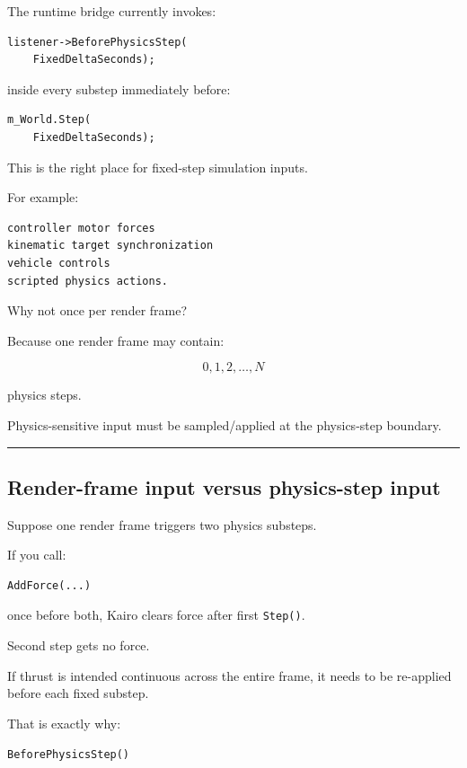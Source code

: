 The runtime bridge currently invokes:

\begin{verbatim}
listener->BeforePhysicsStep(
    FixedDeltaSeconds);
\end{verbatim}

inside every substep immediately before:

\begin{verbatim}
m_World.Step(
    FixedDeltaSeconds);
\end{verbatim}

This is the right place for fixed-step simulation inputs.

For example:

\begin{verbatim}
controller motor forces
kinematic target synchronization
vehicle controls
scripted physics actions.
\end{verbatim}

Why not once per render frame?

Because one render frame may contain:

\[
0,1,2,\dots,N
\]

physics steps.

Physics-sensitive input must be sampled/applied at the physics-step boundary.

\begin{center}\rule{0.5\linewidth}{0.5pt}\end{center}

\subsection{Render-frame input versus physics-step input}\label{06-engine-ii-ch037-render-frame-input-versus-physics-step-input}

Suppose one render frame triggers two physics substeps.

If you call:

\begin{verbatim}
AddForce(...)
\end{verbatim}

once before both, Kairo clears force after first \texttt{Step()}.

Second step gets no force.

If thrust is intended continuous across the entire frame, it needs to be re-applied before each fixed substep.

That is exactly why:

\begin{verbatim}
BeforePhysicsStep()
\end{verbatim}

